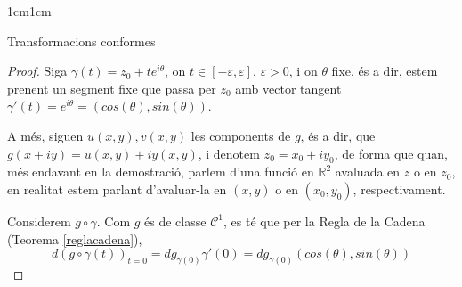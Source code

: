 \begin{adjustwidth}{1cm}{1cm}
\begin{subsection}{Transformacions conformes}
    \begin{proof}
        Siga $\gamma(t)=z_0+te^{i\theta}$, on $t\in[-\varepsilon,\varepsilon]$, $\varepsilon>0$, i on $\theta$ fixe, és a dir, estem prenent un segment fixe que passa per $z_0$ amb vector tangent $\gamma'(t)=e^{i\theta}=(cos(\theta),sin(\theta))$.
        
        A més, siguen $u(x,y),v(x,y)$ les components de $g$, és a dir, que $g(x+iy)=u(x,y)+iy(x,y)$, i denotem $z_0=x_0+iy_0$, de forma que quan, més endavant en la demostració, parlem d'una funció en $\mathbb{R}^2$ avaluada en $z$ o en $z_0$, en realitat estem parlant d'avaluar-la en $(x,y)$ o en $(x_0,y_0)$, respectivament.
        
        Considerem $g\circ\gamma$. Com $g$ és de classe $\mathcal{C}^1$, es té que per la Regla de la Cadena (Teorema \ref{reglacadena}),
        \[
            d(g\circ\gamma(t))_{t=0}=dg_{\gamma(0)}\gamma'(0)=dg_{\gamma(0)}(cos(\theta),sin(\theta))
        \]


\end{proof}
\end{subsection}
\end{adjustwidth}
